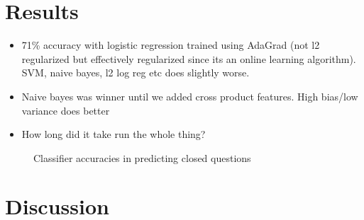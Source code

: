 \documentclass[11pt]{article}
\begin{document}
\section{Results}
\begin{itemize}
\item 71\% accuracy with logistic regression trained using AdaGrad (not l2 regularized but effectively regularized since its an online learning algorithm). SVM, naive bayes, l2 log reg etc does slightly worse.
\item Naive bayes was winner until we added cross product
  features. High bias/low variance does better
  \item How long did it take run the whole thing?
\end{itemize}

\begin{figure}
\centering
{}
\caption{Classifier accuracies in predicting closed questions}
\label{fig:results}
\end{figure}

\section{Discussion}
\end{document}
